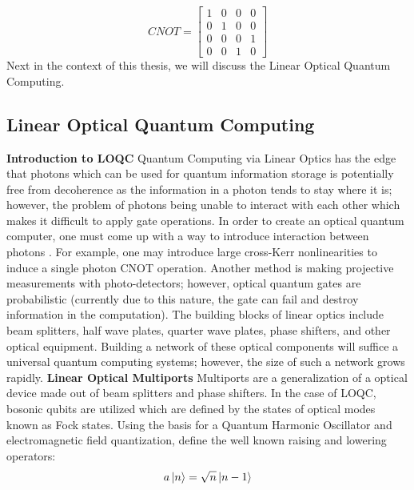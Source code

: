 \begin{equation}
    CNOT = 
    \begin{bmatrix}
    1 & 0 & 0 & 0 \\
    0 & 1 & 0 & 0 \\
    0 & 0 & 0 & 1 \\
    0 & 0 & 1 & 0
    \end{bmatrix}
\end{equation}
Next in the context of this thesis, we will discuss the Linear Optical Quantum Computing. 
\subsection{Linear Optical Quantum Computing} \newline
\textbf{Introduction to LOQC} \newline
Quantum Computing via Linear Optics has the edge that photons which can be used for quantum information storage is potentially free from decoherence as the information in a photon tends to stay where it is; however, the problem of photons being unable to interact with each other which makes it difficult to apply gate operations. In order to create an optical quantum computer, one must come up with a way to introduce interaction between photons \cite{RevModPhys.79.135}. For example, one may introduce large cross-Kerr nonlinearities to induce a single photon CNOT operation. Another method is making projective measurements with photo-detectors; however, optical quantum gates are probabilistic (currently due to this nature, the gate can fail and destroy information in the computation). \newline
The building blocks of linear optics include beam splitters, half wave plates, quarter wave plates, phase shifters, and other optical equipment. Building a network of these optical components will suffice a universal quantum computing systems; however, the size of such a network grows rapidly. \newline
\textbf{Linear Optical Multiports} \newline
Multiports are a generalization of a optical device made out of beam splitters and phase shifters. In the case of LOQC, bosonic qubits are utilized which are defined by the states of optical modes known as Fock states. Using the basis for a Quantum Harmonic Oscillator and electromagnetic field quantization, define the well known raising and lowering operators: 
\begin{equation}
    a\ket{n} = \sqrt{n} \ket{n-1}
\end{equation}

